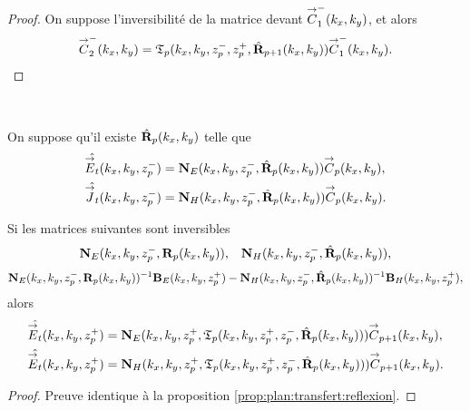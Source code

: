 \begin{proof}
      On suppose l'inversibilité de la matrice devant \({\overset{\rightarrow}{C}}_{1}^-(k_x,k_y)\), et alors
      \begin{equation*}
        {\overset{\rightarrow}{C}}_{2}^-(k_x,k_y) = \mathfrak{T}_p(k_x,k_y,z_p^-,z_p^+,\hat{\mathbf{R}}_{p+1}(k_x,k_y)) {\overset{\rightarrow}{C}}_{1}^-(k_x,k_y).
      \end{equation*}
    \end{proof}

    \begin{prop}%
      \label{prop:plan:relevement:reflexion}{}~

      On suppose qu'il existe \(\hat{\mathbf{R}}_{p}(k_x,k_y)\) telle que 
      \begin{align*}
        \hat{{\overset{\rightarrow}{E}}_t}(k_x,k_y,z_p^-) &= \mathbf{N}_{E}(k_x,k_y,z_p^-,\hat{\mathbf{R}}_{p}(k_x,k_y)){\overset{\rightarrow}{C}}_{p}(k_x,k_y),
        \\
        \hat{{\overset{\rightarrow}{J}}_t}(k_x,k_y,z_p^-) &= \mathbf{N}_{H}(k_x,k_y,z_p^-,\hat{\mathbf{R}}_{p}(k_x,k_y)){\overset{\rightarrow}{C}}_{p}(k_x,k_y).
      \end{align*}

      Si les matrices suivantes sont inversibles
      \begin{align*}
        \mathbf{N}_{E}(k_x,k_y,z_p^-,\mathbf{R}_{p}(k_x,k_y)), && \mathbf{N}_{H}(k_x,k_y,z_p^-,\hat{\mathbf{R}}_{p}(k_x,k_y)),
      \end{align*}
      \begin{align*}
        \mathbf{N}_{E}(k_x,k_y,z_p^-,\mathbf{R}_{p}(k_x,k_y))^{-1}\mathbf{B}_{E}(k_x,k_y,z_p^+) - \mathbf{N}_{H}(k_x,k_y,z_p^-,\hat{\mathbf{R}}_{p}(k_x,k_y))^{-1}\mathbf{B}_{H}(k_x,k_y,z_p^+),
      \end{align*}
      alors
      \begin{align*}
        \hat{{\overset{\rightarrow}{E}}_t}(k_x,k_y,z_p^+) &= \mathbf{N}_{E}(k_x,k_y,z_p^+,\mathfrak{T}_p(k_x,k_y,z_p^+,z_p^-,\hat{\mathbf{R}}_{p}(k_x,k_y))){\overset{\rightarrow}{C}}_{p+1}(k_x,k_y),
        \\
        \hat{{\overset{\rightarrow}{E}}_t}(k_x,k_y,z_p^+) &= \mathbf{N}_{H}(k_x,k_y,z_p^+,\mathfrak{T}_p(k_x,k_y,z_p^+,z_p^-,\hat{\mathbf{R}}_{p}(k_x,k_y))){\overset{\rightarrow}{C}}_{p+1}(k_x,k_y).
      \end{align*}
    \end{prop}

    \begin{proof}
      Preuve identique à la proposition \ref{prop:plan:transfert:reflexion}.
    \end{proof}

